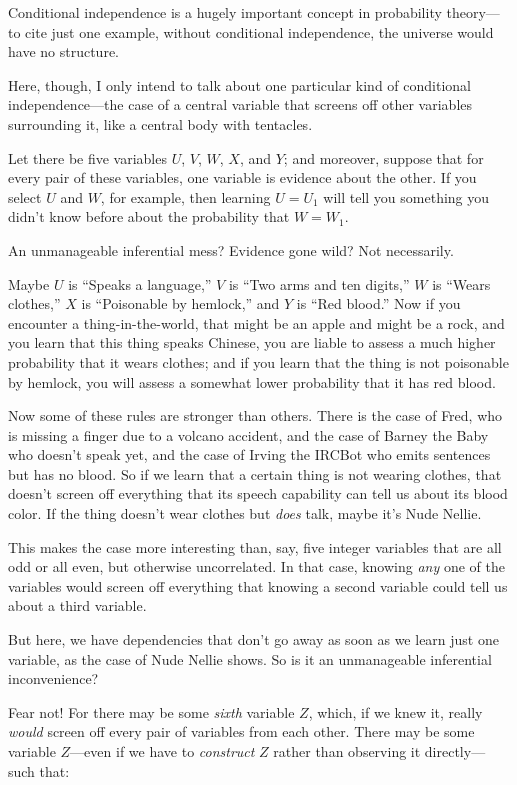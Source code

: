 {
 Conditional independence is a hugely important concept in
probability theory---to cite just one example, without conditional
independence, the universe would have no structure.}

{
 Here, though, I only intend to talk about one particular kind of
conditional independence---the case of a central variable that screens
off other variables surrounding it, like a central body with
tentacles.}

{
 Let there be five variables $U$, $V$, $W$, $X$, and $Y$; and moreover,
suppose that for every pair of these variables, one variable is
evidence about the other. If you select $U$ and $W$, for example, then
learning $U = U_{1}$ will tell you something you
didn't know before about the probability that $W =
W_{1}$.}

{
 An unmanageable inferential mess? Evidence gone wild? Not
necessarily.}

{
 Maybe $U$ is ``Speaks a
language,'' $V$ is ``Two arms and ten
digits,'' $W$ is ``Wears
clothes,'' $X$ is ``Poisonable by
hemlock,'' and $Y$ is ``Red
blood.'' Now if you encounter a thing-in-the-world,
that might be an apple and might be a rock, and you learn that this
thing speaks Chinese, you are liable to assess a much higher
probability that it wears clothes; and if you learn that the thing is
not poisonable by hemlock, you will assess a somewhat lower probability
that it has red blood.}

{
 Now some of these rules are stronger than others. There is the
case of Fred, who is missing a finger due to a volcano accident, and
the case of Barney the Baby who doesn't speak yet, and
the case of Irving the IRCBot who emits sentences but has no blood. So
if we learn that a certain thing is not wearing clothes, that
doesn't screen off everything that its speech
capability can tell us about its blood color. If the thing
doesn't wear clothes but \textit{does} talk, maybe
it's Nude Nellie.}

{
 This makes the case more interesting than, say, five integer
variables that are all odd or all even, but otherwise uncorrelated. In
that case, knowing \textit{any} one of the variables would screen off
everything that knowing a second variable could tell us about a third
variable.}

{
 But here, we have dependencies that don't go away
as soon as we learn just one variable, as the case of Nude Nellie
shows. So is it an unmanageable inferential inconvenience?}

{
 Fear not! For there may be some \textit{sixth} variable $Z$, which,
if we knew it, really \textit{would} screen off every pair of variables
from each other. There may be some variable $Z$---even if we have to
\textit{construct} $Z$ rather than observing it directly---such that:}

